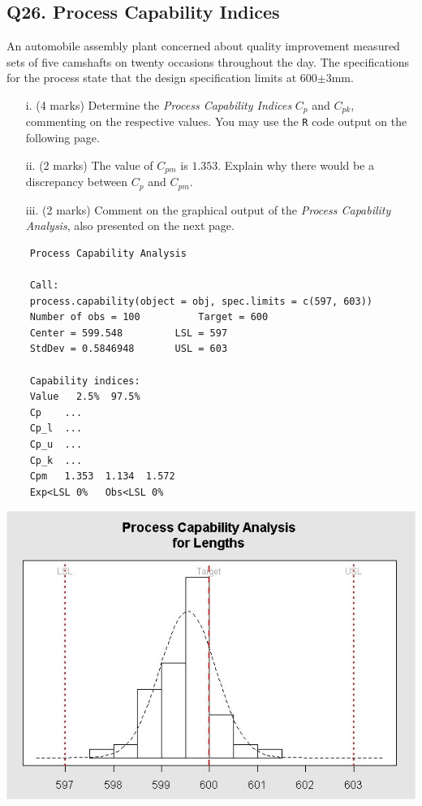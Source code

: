 \documentclass[a4paper,12pt]{article}
\begin{document}
\subsection*{Q26. Process Capability Indices} 

An automobile assembly plant concerned about quality improvement measured sets of five camshafts on twenty occasions throughout the day. The specifications for the process state that the design specification limits at 600$\pm$3mm.


\begin{itemize}
	\item[i.] (4 marks) Determine the \emph{Process Capability Indices} $C_p$ and $C_{pk}$, commenting on the respective values. You may use the \texttt{R} code output on the following page.
	\item[ii.] (2 marks)  The value of $C_{pm}$ is $1.353$. Explain why there would be a discrepancy between $C_p$ and $C_{pm}$.
	\item[iii.] (2 marks) Comment on the graphical output of the \emph{Process Capability Analysis}, also presented on the next page.
\end{itemize}


\newpage
\begin{framed}
	\begin{verbatim}
	Process Capability Analysis
	
	Call:
	process.capability(object = obj, spec.limits = c(597, 603))
	Number of obs = 100          Target = 600
	Center = 599.548         LSL = 597
	StdDev = 0.5846948       USL = 603
	
	Capability indices:
	Value   2.5%  97.5%
	Cp    ...
	Cp_l  ...
	Cp_u  ...
	Cp_k  ...
	Cpm   1.353  1.134  1.572
	Exp<LSL 0%   Obs<LSL 0%
	\end{verbatim}
\end{framed}



\begin{center}
	\includegraphics[scale=0.55]{images/ExamQ4hist}
\end{center}
\newpage
%
%
%
\end{document}
